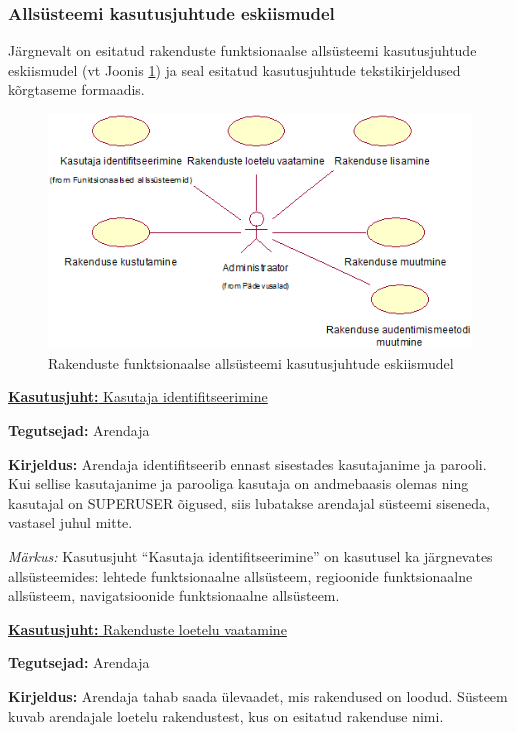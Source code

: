 \documentclass[a4paper,12pt]{article} %
\begin{document}
\subsubsection{Allsüsteemi kasutusjuhtude eskiismudel}
Järgnevalt on esitatud rakenduste funktsionaalse allsüsteemi kasutusjuhtude eskiismudel (vt Joonis \ref{fig_rakenduste_funktsionaalse_allsüsteemi_kasutusjuhtude_eskiismudel}) ja seal esitatud kasutusjuhtude tekstikirjeldused kõrgtaseme formaadis.
\begin{figure}[H]
\begin{center}
\includegraphics[bb=0 0 512 284,scale=1]{./diagrams/applications-subsystem-use-case-digram.png}
\caption{Rakenduste funktsionaalse allsüsteemi kasutusjuhtude eskiismudel}
\label{fig_rakenduste_funktsionaalse_allsüsteemi_kasutusjuhtude_eskiismudel}
\end{center}
\end{figure}
\underline{\textbf{Kasutusjuht:} Kasutaja identifitseerimine}
\par
\textbf{Tegutsejad:} Arendaja
\par
\textbf{Kirjeldus:} Arendaja identifitseerib ennast sisestades kasutajanime ja parooli. Kui sellise kasutajanime ja parooliga kasutaja on andmebaasis olemas ning kasutajal on SUPERUSER õigused, siis lubatakse arendajal süsteemi siseneda, vastasel juhul mitte.
\par
\textit{Märkus:} Kasutusjuht  ``Kasutaja identifitseerimine'' on kasutusel ka järgnevates allsüsteemides: lehtede funktsionaalne allsüsteem, regioonide funktsionaalne allsüsteem, navigatsioonide funktsionaalne allsüsteem.\par

\underline{\textbf{Kasutusjuht:} Rakenduste loetelu vaatamine}
\par
\textbf{Tegutsejad:} Arendaja
\par
\textbf{Kirjeldus:} Arendaja tahab saada ülevaadet, mis rakendused on loodud. Süsteem kuvab arendajale loetelu rakendustest, kus on esitatud rakenduse nimi.
\par
\end{document}
